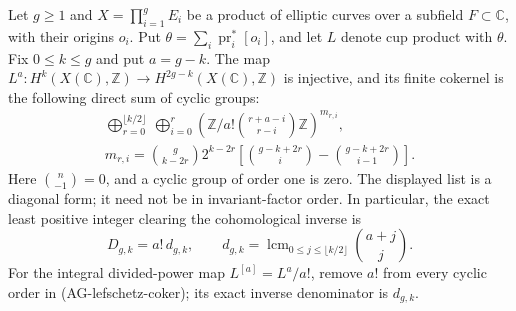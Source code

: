 \begin{proposition}
Let $g\ge1$ and $X=\prod_{i=1}^{g}E_i$ be a product of elliptic curves over a
subfield $F\subset\mathbb C$, with their origins $o_i$.  Put
$\theta=\sum_i\operatorname{pr}_i^*[o_i]$, and let $L$ denote
cup product with $\theta$.  Fix $0\le k\le g$ and put $a=g-k$.
The map $L^a:H^k(X(\mathbb C),\mathbb Z)\longrightarrow
H^{2g-k}(X(\mathbb C),\mathbb Z)$ is injective, and its finite
cokernel is the following direct sum of cyclic groups:
\begin{equation}
 \begin{gathered}
 \displaystyle\bigoplus_{r=0}^{\lfloor k/2\rfloor}\ 
 \bigoplus_{i=0}^{r}
 \left(\mathbb Z\Big/
 a!\binom{r+a-i}{r-i}\mathbb Z\right)^{m_{r,i}},\\
 m_{r,i}=\binom{g}{k-2r}2^{k-2r}
 \left[\binom{g-k+2r}{i}-\binom{g-k+2r}{i-1}\right].
 \end{gathered}
 \tag{AG-lefschetz-coker}
\end{equation}
Here $\binom n{-1}=0$, and a cyclic group of order one is zero.
The displayed list is a diagonal form; it need not be in
invariant-factor order.  In particular, the exact least positive
integer clearing the cohomological inverse is
\begin{equation}
 D_{g,k}=a!\,d_{g,k},\qquad
 d_{g,k}=\operatorname{lcm}_{0\le j\le\lfloor k/2\rfloor}
                         \binom{a+j}{j}.
 \tag{AG-lefschetz-denominator}
\end{equation}
For the integral divided-power map $L^{[a]}=L^a/a!$, remove
$a!$ from every cyclic order in (AG-lefschetz-coker); its exact
inverse denominator is $d_{g,k}$.
\end{proposition}
